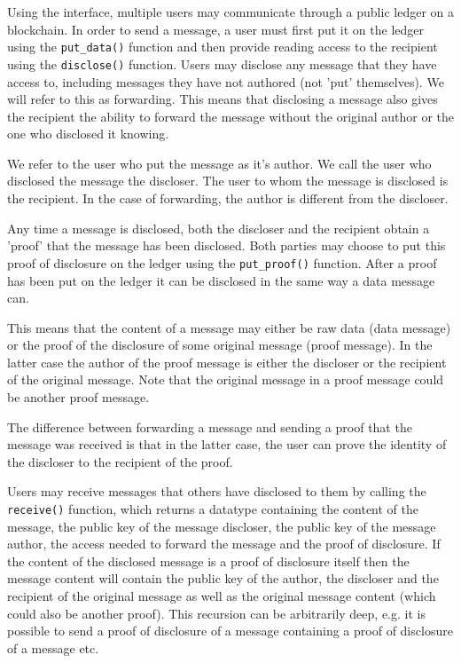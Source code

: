 \documentclass[a4paper]{article} %
\begin{document}
Using the interface, multiple users may communicate through a public ledger on a blockchain. In order to send a message, a user must first put it on the ledger using the \lstinline{put_data()} function and then provide reading access to the recipient using the \lstinline{disclose()} function. Users may disclose any message that they have access to, including messages they have not authored (not 'put' themselves). We will refer to this as forwarding. This means that disclosing a message also gives the recipient the ability to forward the message without the original author or the one who disclosed it knowing.

We refer to the user who put the message as it's author. We call the user who disclosed the message the discloser. The user to whom the message is disclosed is the recipient. In the case of forwarding, the author is different from the discloser.

Any time a message is disclosed, both the discloser and the recipient obtain a 'proof' that the message has been disclosed. Both parties may choose to put this proof of disclosure on the ledger using the \lstinline{put_proof()} function. After a proof has been put on the ledger it can be disclosed in the same way a data message can.

This means that the content of a message may either be raw data (data message) or the proof of the disclosure of some original message (proof message). In the latter case the author of the proof message is either the discloser or the recipient of the original message. Note that the original message in a proof message could be another proof message.

The difference between forwarding a message and sending a proof that the message was received is that in the latter case, the user can prove the identity of the discloser to the recipient of the proof.

Users may receive messages that others have disclosed to them by calling the \lstinline{receive()} function, which returns a datatype containing the content of the message, the public key of the message discloser, the public key of the message author, the access needed to forward the message and the proof of disclosure. If the content of the disclosed message is a proof of disclosure itself then the message content will contain the public key of the author, the discloser and the recipient of the original message as well as the original message content (which could also be another proof). This recursion can be arbitrarily deep, e.g. it is possible to send a proof of disclosure of a message containing a proof of disclosure of a message etc.
\end{document}
